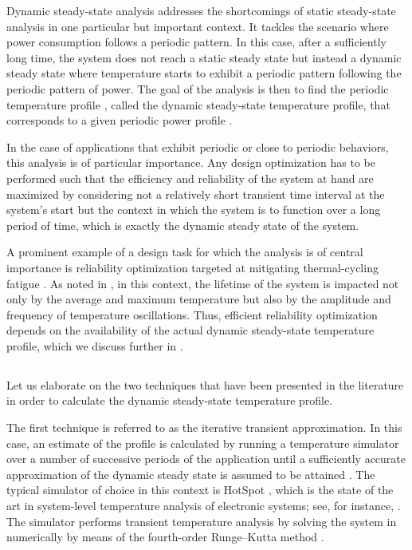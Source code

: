 Dynamic steady-state analysis addresses the shortcomings of static steady-state
analysis in one particular but important context. It tackles the scenario where
power consumption follows a periodic pattern. In this case, after a sufficiently
long time, the system does not reach a static steady state but instead a dynamic
steady state where temperature starts to exhibit a periodic pattern following
the periodic pattern of power. The goal of the analysis is then to find the
periodic temperature profile \mq, called the dynamic steady-state temperature
profile, that corresponds to a given periodic power profile \mp.

In the case of applications that exhibit periodic or close to periodic
behaviors, this analysis is of particular importance. Any design optimization
has to be performed such that the efficiency and reliability of the system at
hand are maximized by considering not a relatively short transient time interval
at the system's start but the context in which the system is to function over a
long period of time, which is exactly the dynamic steady state of the system.

A prominent example of a design task for which the analysis is of central
importance is reliability optimization targeted at mitigating thermal-cycling
fatigue \cite{jedec2016}. As noted in , in this
context, the lifetime of the system is impacted not only by the average and
maximum temperature but also by the amplitude and frequency of temperature
oscillations. Thus, efficient reliability optimization depends on the
availability of the actual dynamic steady-state temperature profile, which we
discuss further in .

\subsection{\pasttitle}

Let us elaborate on the two techniques that have been presented in the
literature in order to calculate the dynamic steady-state temperature profile.

The first technique is referred to as the iterative transient approximation. In
this case, an estimate of the profile is calculated by running a temperature
simulator over a number of successive periods of the application until a
sufficiently accurate approximation of the dynamic steady state is assumed to be
attained \cite{srinivasan2004}. The typical simulator of choice in this context
is HotSpot \cite{skadron2003}, which is the state of the art in system-level
temperature analysis of electronic systems; see, for instance,
\cite{srinivasan2004, liao2005, coskun2006, liu2007, huang2009b, xiang2010,
thiele2011, oboril2012, pagani2014}. The simulator performs transient
temperature analysis by solving the system in 
numerically by means of the fourth-order Runge--Kutta method \cite{press2007}.

